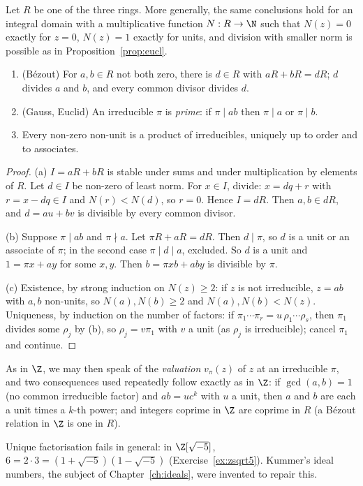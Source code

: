 \begin{theorem}\label{thm:ufd}
Let $R$ be one of the three rings. More generally, the same conclusions
hold for an integral domain with a multiplicative function $N:R\to\N$
such that $N(z)=0$ exactly for $z=0$, $N(z)=1$ exactly for units,
and division with smaller norm is possible as in
Proposition~\ref{prop:eucl}.
\begin{enumerate}[label=(\alph*)]
\item (B\'ezout) For $a,b\in R$ not both zero, there is $d\in R$ with $aR+bR=dR$; $d$ divides $a$ and $b$, and every common divisor divides $d$.
\item (Gauss, Euclid) An irreducible $\pi$ is \emph{prime}: if $\pi\mid ab$ then $\pi\mid a$ or $\pi\mid b$.
\item Every non-zero non-unit is a product of irreducibles, uniquely up to order and to associates.
\end{enumerate}
\end{theorem}
\begin{proof}
(a) $I=aR+bR$ is stable under sums and under multiplication by elements of $R$. Let $d\in I$ be non-zero of least norm. For $x\in I$, divide: $x=dq+r$ with $r=x-dq\in I$ and $N(r)<N(d)$, so $r=0$. Hence $I=dR$. Then $a,b\in dR$, and $d=au+bv$ is divisible by every common divisor.

(b) Suppose $\pi\mid ab$ and $\pi\nmid a$. Let $\pi R+aR=dR$. Then $d\mid\pi$, so $d$ is a unit or an associate of $\pi$; in the second case $\pi\mid d\mid a$, excluded. So $d$ is a unit and $1=\pi x+ay$ for some $x,y$. Then $b=\pi xb+aby$ is divisible by $\pi$.

(c) Existence, by strong induction on $N(z)\ge2$: if $z$ is not irreducible, $z=ab$ with $a,b$ non-units, so $N(a),N(b)\ge2$ and $N(a),N(b)<N(z)$. Uniqueness, by induction on the number of factors: if $\pi_1\cdots\pi_r=u\,\rho_1\cdots\rho_s$, then $\pi_1$ divides some $\rho_j$ by (b), so $\rho_j=v\pi_1$ with $v$ a unit (as $\rho_j$ is irreducible); cancel $\pi_1$ and continue.
\end{proof}

As in $\Z$, we may then speak of the \emph{valuation} $v_\pi(z)$ of $z$ at an irreducible $\pi$, and two consequences used repeatedly follow exactly as in $\Z$: if $\gcd(a,b)=1$ (no common irreducible factor) and $ab=uc^k$ with $u$ a unit, then $a$ and $b$ are each a unit times a $k$-th power; and integers coprime in $\Z$ are coprime in $R$ (a B\'ezout relation in $\Z$ is one in $R$).

\begin{remark}
Unique factorisation fails in general: in $\Z[\sqrt{-5}]$, $6=2\cdot3=(1+\sqrt{-5})(1-\sqrt{-5})$ (Exercise~\ref{ex:zsqrt5}). Kummer's ideal numbers, the subject of Chapter~\ref{ch:ideals}, were invented to repair this.
\end{remark}

